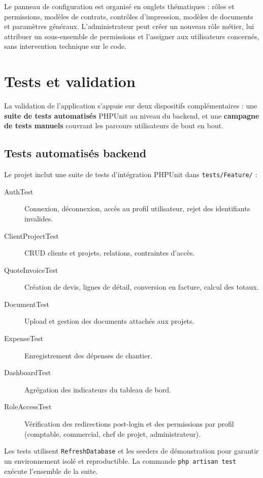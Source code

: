 \medskip

Le panneau de configuration est organisé en onglets thématiques : rôles et permissions,
modèles de contrats, contrôles d'impression, modèles de documents et paramètres
généraux. L'administrateur peut créer un nouveau rôle métier, lui attribuer un
sous-ensemble de permissions et l'assigner aux utilisateurs concernés, sans
intervention technique sur le code.

\section{Tests et validation}

La validation de l'application s'appuie sur deux dispositifs complémentaires : une
\textbf{suite de tests automatisés} PHPUnit au niveau du backend, et une
\textbf{campagne de tests manuels} couvrant les parcours utilisateurs de bout en bout.

\subsection{Tests automatisés backend}

Le projet inclut une suite de tests d'intégration PHPUnit dans \texttt{tests/Feature/} :

\begin{description}
  \item[AuthTest] Connexion, déconnexion, accès au profil utilisateur, rejet des
  identifiants invalides.
  \item[ClientProjectTest] CRUD clients et projets, relations, contraintes d'accès.
  \item[QuoteInvoiceTest] Création de devis, lignes de détail, conversion en facture,
  calcul des totaux.
  \item[DocumentTest] Upload et gestion des documents attachés aux projets.
  \item[ExpenseTest] Enregistrement des dépenses de chantier.
  \item[DashboardTest] Agrégation des indicateurs du tableau de bord.
  \item[RoleAccessTest] Vérification des redirections post-login et des permissions
  par profil (comptable, commercial, chef de projet, administrateur).
\end{description}

Les tests utilisent \texttt{RefreshDatabase} et les seeders de démonstration pour
garantir un environnement isolé et reproductible. La commande \texttt{php artisan test}
exécute l'ensemble de la suite.


